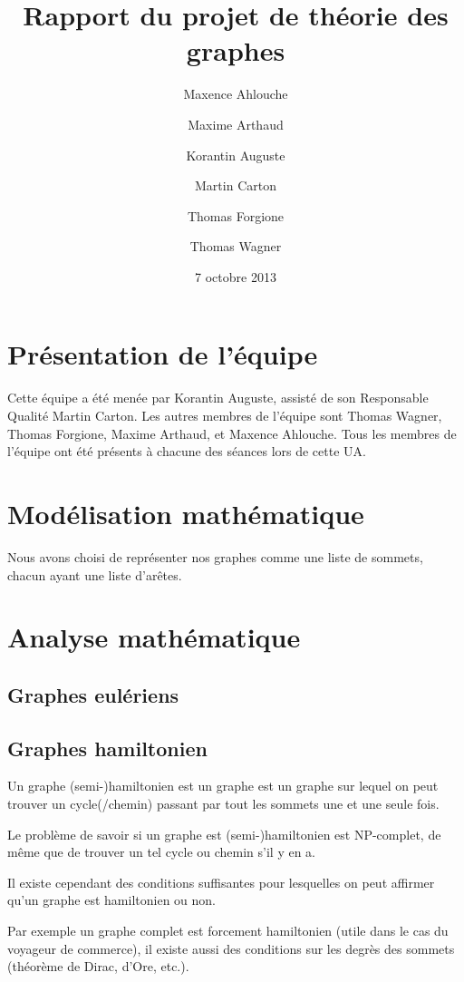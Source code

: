 \documentclass{scrartcl}
\begin{document}
\title{Rapport du projet de théorie des graphes}
\author{Maxence Ahlouche \and Maxime Arthaud \and Korantin Auguste
          \and Martin Carton \and Thomas Forgione \and Thomas Wagner}
\date{7 octobre 2013}
\maketitle
\tableofcontents
\lstlistoflistings
\newpage

\section{Présentation de l'équipe}
  Cette équipe a été menée par Korantin Auguste, assisté de son Responsable
  Qualité Martin Carton. Les autres membres de l'équipe sont Thomas Wagner,
  Thomas Forgione, Maxime Arthaud, et Maxence Ahlouche.  Tous les membres de
  l'équipe ont été présents à chacune des séances lors de cette UA.

\section{Modélisation mathématique}
  Nous avons choisi de représenter nos graphes comme une liste de sommets,
  chacun ayant une liste d'arêtes.

\section{Analyse mathématique}
  \subsection{Graphes eulériens}
  \subsection{Graphes hamiltonien}
    Un graphe (semi-)hamiltonien est un graphe est un graphe sur lequel on peut
    trouver un cycle(/chemin) passant par tout les sommets une et une seule
    fois.

    Le problème de savoir si un graphe est (semi-)hamiltonien est NP-complet,
    de même que de trouver un tel cycle ou chemin s'il y en a.

    Il existe cependant des conditions suffisantes pour lesquelles on peut
    affirmer qu'un graphe est hamiltonien ou non.

    Par exemple un graphe complet est forcement hamiltonien (utile dans le cas
    du voyageur de commerce), il existe aussi des conditions sur les degrès des
    sommets (théorème de Dirac, d'Ore, etc.).
\end{document}
